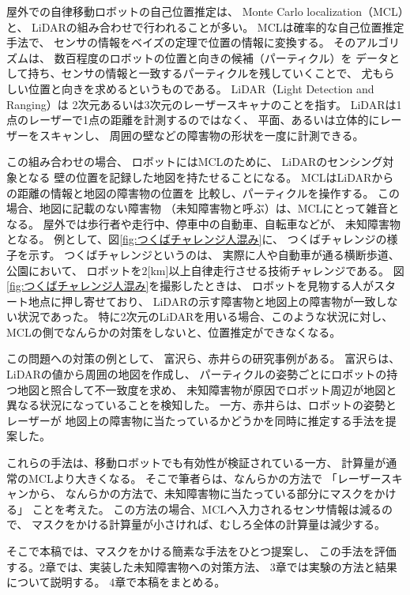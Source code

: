 \documentclass{jarticle}
\begin{document}
屋外での自律移動ロボットの自己位置推定は、
Monte Carlo localization（MCL）\cite{gutmann2002}と、
LiDARの組み合わせで行われることが多い。
MCLは確率的な自己位置推定手法で、
センサの情報をベイズの定理で位置の情報に変換する。
そのアルゴリズムは、
数百程度のロボットの位置と向きの候補（パーティクル）を
データとして持ち、センサの情報と一致するパーティクルを残していくことで、
尤もらしい位置と向きを求めるというものである。
LiDAR（Light Detection and Ranging）は
2次元あるいは3次元のレーザースキャナのことを指す。
LiDARは1点のレーザーで1点の距離を計測するのではなく、
平面、あるいは立体的にレーザーをスキャンし、
周囲の壁などの障害物の形状を一度に計測できる。


この組み合わせの場合、
ロボットにはMCLのために、
LiDARのセンシング対象となる
壁の位置を記録した地図を持たせることになる。
MCLはLiDARからの距離の情報と地図の障害物の位置を
比較し、パーティクルを操作する。
この場合、地図に記載のない障害物
（未知障害物と呼ぶ）は、MCLにとって雑音となる。
屋外では歩行者や走行中、停車中の自動車、自転車などが、
未知障害物となる。
例として、図\ref{fig:つくばチャレンジ人混み}に、
つくばチャレンジ\cite{つくばチャレンジ}の様子を示す。
つくばチャレンジというのは、
実際に人や自動車が通る横断歩道、公園において、
ロボットを$2$[km]以上自律走行させる技術チャレンジである。
図\ref{fig:つくばチャレンジ人混み}を撮影したときは、
ロボットを見物する人がスタート地点に押し寄せており、
LiDARの示す障害物と地図上の障害物が一致しない状況であった。
特に2次元のLiDARを用いる場合、このような状況に対し、
MCLの側でなんらかの対策をしないと、位置推定ができなくなる。

この問題への対策の例として、
富沢ら\cite{富沢2012}、赤井ら\cite{赤井2019}の研究事例がある。
富沢らは、LiDARの値から周囲の地図を作成し、
パーティクルの姿勢ごとにロボットの持つ地図と照合して不一致度を求め、
未知障害物が原因でロボット周辺が地図と異なる状況になっていることを検知した。
一方、赤井らは、ロボットの姿勢とレーザーが
地図上の障害物に当たっているかどうかを同時に推定する手法を提案した。


これらの手法は、移動ロボットでも有効性が検証されている一方、
計算量が通常のMCLより大きくなる。
そこで筆者らは、なんらかの方法で
「レーザースキャンから、
なんらかの方法で、未知障害物に当たっている部分にマスクをかける」
ことを考えた。
この方法の場合、MCLへ入力されるセンサ情報は減るので、
マスクをかける計算量が小さければ、むしろ全体の計算量は減少する。

そこで本稿では、マスクをかける簡素な手法をひとつ提案し、
この手法を評価する。2章では、実装した未知障害物への対策方法、
3章では実験の方法と結果について説明する。
4章で本稿をまとめる。
\end{document}
